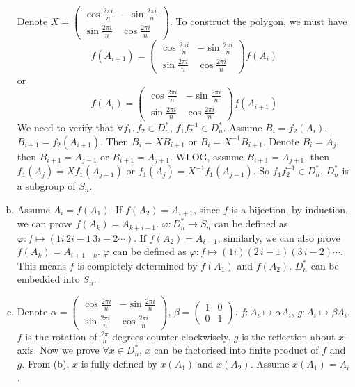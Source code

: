 \begin{answer}
\begin{enumerate}[(a)]
        Denote $X=\begin{pmatrix}
            \cos \frac{2\pi i}{n}&-\sin\frac{2\pi i}{n}\\\sin\frac{2\pi i}{n}&\cos \frac{2\pi i}{n}
        \end{pmatrix}$. To construct the polygon,  we must have \[f(A_{i+1})=\begin{pmatrix}
            \cos \frac{2\pi i}{n}&-\sin\frac{2\pi i}{n}\\\sin\frac{2\pi i}{n}&\cos \frac{2\pi i}{n}
        \end{pmatrix}f(A_{i})\] or \[f(A_{i})=\begin{pmatrix}
            \cos \frac{2\pi i}{n}&-\sin\frac{2\pi i}{n}\\\sin\frac{2\pi i}{n}&\cos \frac{2\pi i}{n}
        \end{pmatrix}f(A_{i+1})\] We need to verify that $\forall f_{1}, f_{2}\in D_{n}^{*}$, $f_{1}f_{2}^{-1}\in D_{n}^{*}$. Assume $B_{i}=f_{2}(A_{i})$, $B_{i+1}=f_{2}(A_{i+1})$. Then $B_{i}=XB_{i+1}$ or $B_{i}=X^{-1}B_{i+1}$. Denote $B_{i}=A_{j}$, then $B_{i+1}=A_{j-1}$ or $B_{i+1}=A_{j+1}$. WLOG, assume $B_{i+1}=A_{j+1}$, then $f_{1}(A_{j})=Xf_{1}(A_{j+1})$ or $f_{1}(A_{j})=X^{-1}f_{1}(A_{j-1})$. So $f_{1}f_{2}^{-1}\in D_{n}^{*}$. $D_{n}^{*}$ is a subgroup of $S_{n}$.
        \item Assume $A_{i}=f(A_{1})$. If $f(A_{2})=A_{i+1}$, since $f$ is a bijection, by induction, we can prove $f(A_{k})=A_{k+i-1}$. $\varphi: D_{n}^{*}\to S_{n}$ can be defined as $\varphi: f\mapsto (1i\,2i-1\,3i-2\cdots)$. If $f(A_{2})=A_{i-1}$, similarly, we can also prove $f(A_{k})=A_{i+1-k}$. $\varphi$ can be defined as $\varphi: f\mapsto (1i)(2\,i-1)(3\,i-2)\cdots$. This means $f$ is completely determined by $f(A_{1})$ and $f(A_{2})$. $D_{n}^{*}$ can be embedded into $S_{n}$.
        \item Denote $\alpha=\begin{pmatrix}
            \cos \frac{2\pi i}{n}&-\sin\frac{2\pi i}{n}\\\sin\frac{2\pi i}{n}&\cos \frac{2\pi i}{n}
        \end{pmatrix}$, $\beta=\begin{pmatrix}
            1&0\\0&1
        \end{pmatrix}$. $f:A_{i}\mapsto \alpha A_{i}$, $g:A_{i}\mapsto \beta A_{i}$. $f$ is the rotation of $\frac{2\pi}{n}$ degrees counter-clockwisely. $g$ is the reflection about $x$-axis. Now we prove $\forall x\in D_{n}^{*}$, $x$ can be factorised into finite product of $f$ and $g$. From (b), $x$ is fully defined by $x(A_{1})$ and $x(A_{2})$. Assume $x(A_{1})=A_{i}$.


\end{enumerate}
\end{answer}
